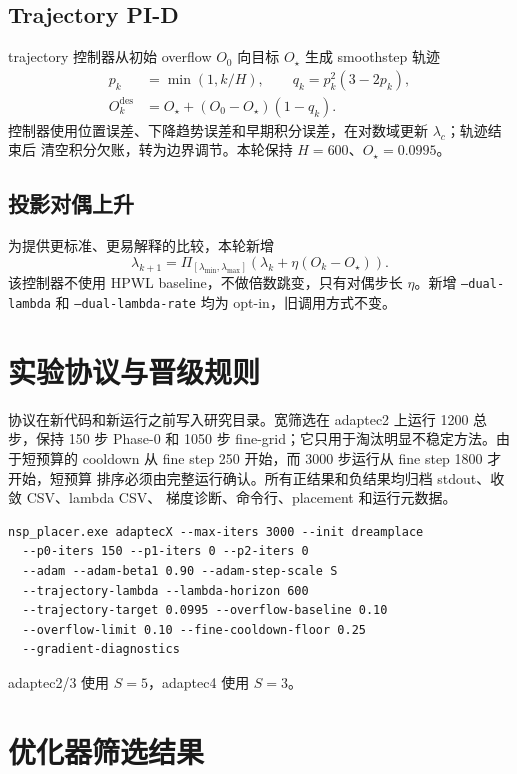 \documentclass[UTF8,fontset=windows,a4paper,11pt]{ctexart}
\newcommand{\code}[1]{\texttt{#1}}
\begin{document}
\subsection{Trajectory PI-D}

trajectory 控制器从初始 overflow $O_0$ 向目标 $O_\star$ 生成 smoothstep 轨迹
\begin{align}
 p_k&=\min(1,k/H),\qquad q_k=p_k^2(3-2p_k),\\
 O_k^{\mathrm{des}}&=O_\star+(O_0-O_\star)(1-q_k).
 \label{eq:trajectory}
\end{align}
控制器使用位置误差、下降趋势误差和早期积分误差，在对数域更新 $\lambda_c$；轨迹结束后
清空积分欠账，转为边界调节。本轮保持 $H=600$、$O_\star=0.0995$。

\subsection{投影对偶上升}

为提供更标准、更易解释的比较，本轮新增
\begin{equation}
 \lambda_{k+1}=\Pi_{[\lambda_{\min},\lambda_{\max}]}
 \left(\lambda_k+\eta(O_k-O_\star)\right).
 \label{eq:dual}
\end{equation}
该控制器不使用 HPWL baseline，不做倍数跳变，只有对偶步长 $\eta$。新增
\code{--dual-lambda} 和 \code{--dual-lambda-rate} 均为 opt-in，旧调用方式不变。

\section{实验协议与晋级规则}

协议在新代码和新运行之前写入研究目录。宽筛选在 adaptec2 上运行 1200 总步，保持
150 步 Phase-0 和 1050 步 fine-grid；它只用于淘汰明显不稳定方法。由于短预算的
cooldown 从 fine step 250 开始，而 3000 步运行从 fine step 1800 才开始，短预算
排序必须由完整运行确认。所有正结果和负结果均归档 stdout、收敛 CSV、lambda CSV、
梯度诊断、命令行、placement 和运行元数据。

\begin{verbatim}
nsp_placer.exe adaptecX --max-iters 3000 --init dreamplace
  --p0-iters 150 --p1-iters 0 --p2-iters 0
  --adam --adam-beta1 0.90 --adam-step-scale S
  --trajectory-lambda --lambda-horizon 600
  --trajectory-target 0.0995 --overflow-baseline 0.10
  --overflow-limit 0.10 --fine-cooldown-floor 0.25
  --gradient-diagnostics
\end{verbatim}
adaptec2/3 使用 $S=5$，adaptec4 使用 $S=3$。

\section{优化器筛选结果}
\end{document}
